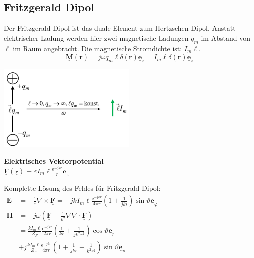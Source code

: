 \documentclass[english]{latex4ei/latex4ei_sheet}
\renewcommand{\vec}[1]{\underline{\boldsymbol{#1}}}
\begin{document}
\begin{sectionbox}

\subsection{Fritzgerald Dipol}
Der Fritzgerald Dipol ist das duale Element zum Hertzschen Dipol. Anstatt elektrischer Ladung werden hier zwei magnetische Ladungen $q_m$ im Abstand von $\ell$ im Raum angebracht.
Die magnetische Stromdichte ist: $I_m \ell$.
$$
\vec{M}(\vec{r})=j \omega q_{m} \ell \delta(\vec{r}) \vec{e}_{z}=I_{m} \ell \delta(\vec{r}) \vec{e}_{z}
$$
\begin{center}
\includegraphics[width=0.5\textwidth]{./img/antennen_fritz_gerald_dipol.png}
\end{center}

\begin{emphbox}
\begin{flushleft}
\textbf{Elektrisches Vektorpotential}\\
$\vec{F}(\vec{r})=\varepsilon I_{m} \ell \frac{\mathrm{e}^{-j k r}}{r} \vec{e}_{z}$
\end{flushleft}
\end{emphbox}
Komplette Lösung des Feldes für Fritzgerald Dipol:\\

$\begin{aligned} \vec{E} &=-\frac{1}{\varepsilon} \nabla \times \vec{F}=-j k I_{m} \ell \frac{\mathrm{e}^{-j k r}}{4 \pi r}\left(1+\frac{1}{j k r}\right) \sin \vartheta \vec{e}_{\varphi} \\ \vec{H} &=-j \omega\left(\vec{F}+\frac{1}{k^{2}} \nabla \nabla \cdot \vec{F}\right) \\ &=\frac{k I_{m} \ell}{Z_{F}} \frac{\mathrm{e}^{-j k r}}{2 \pi r}\left(\frac{1}{k r}+\frac{1}{j k^{2} r^{2}}\right) \cos \vartheta \vec{e}_{r}\\
&+j \frac{k I_{m} \ell}{Z_{F}} \frac{\mathrm{e}^{-j k r}}{4 \pi r}\left(1+\frac{1}{j k r}-\frac{1}{k^{2} r^{2}}\right) \sin \vartheta \vec{e}_{\vartheta} \end{aligned}$

\end{sectionbox}
\end{document}
